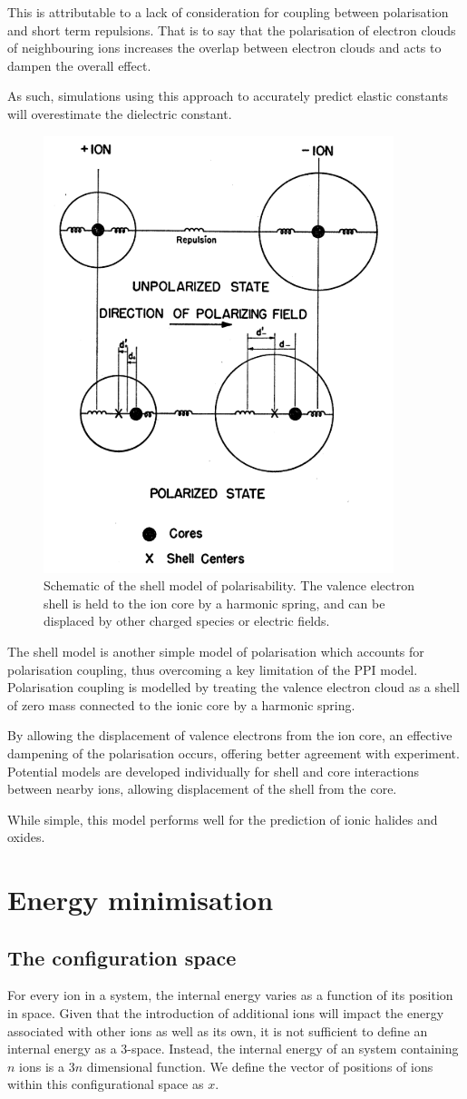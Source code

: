 This is attributable to a lack of consideration for coupling between polarisation and short term repulsions. That is to say that the polarisation of electron clouds of neighbouring ions increases the overlap between electron clouds and acts to dampen the overall effect.

As such, simulations using this approach to accurately predict elastic constants will overestimate the dielectric constant.

\begin{figure}[ht]
  \centering
  \includegraphics[width=0.4\linewidth]{figures/shell}
  \caption[Schematic of the shell model of polarisability.\cite{Dick1958}]{Schematic of the shell model of polarisability.\cite{Dick1958} The valence electron shell is held to the ion core by a harmonic spring, and can be displaced by other charged species or electric fields.}
\end{figure}
The shell model\cite{Dick1958} is another simple model of polarisation which accounts for polarisation coupling, thus overcoming a key limitation of the PPI model.
Polarisation coupling is modelled by treating the valence electron cloud as a shell of zero mass connected to the ionic core by a harmonic spring.

By allowing the displacement of valence electrons from the ion core, an effective dampening of the polarisation occurs, offering better agreement with experiment.
Potential models are developed individually for shell and core interactions between nearby ions, allowing displacement of the shell from the core.


While simple, this model performs well for the prediction of ionic halides and oxides.
\section{Energy minimisation}
\subsection{The configuration space}
For every ion in a system, the internal energy varies as a function of its position in space.
Given that the introduction of additional ions will impact the energy associated with other ions as well as its own, it is not sufficient to define an internal energy as a 3-space.
Instead, the internal energy of an system containing $n$ ions is a $3n$ dimensional function.
We define the vector of positions of ions within this configurational space as $x$.

